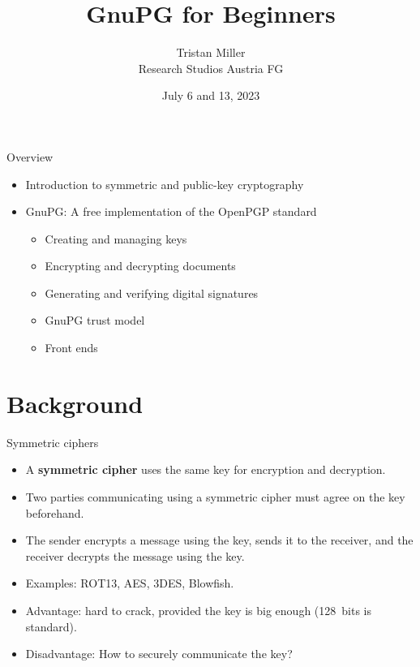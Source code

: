 \documentclass[
mode=present,
paper=smartboard,
size=20pt,
]{powerdot}
\title{GnuPG for Beginners}
\author{%
  Tristan Miller\\
  Research Studios Austria FG
}
\date{July 6 and 13, 2023}
\begin{document}
\maketitle

\begin{slide}[toc=]{Overview}
  \begin{itemize}
  \item Introduction to symmetric and public-key cryptography
  \item GnuPG: A free implementation of the OpenPGP standard
    \begin{itemize}
    \item Creating and managing keys
    \item Encrypting and decrypting documents
    \item Generating and verifying digital signatures
    \item GnuPG trust model
    \item Front ends
    \end{itemize}
  \end{itemize}
\end{slide}

\section{Background}
\begin{slide}{Symmetric ciphers}
  \begin{itemize}
  \item A \textbf{symmetric cipher} uses the same key for encryption
    and decryption.
  \item Two parties communicating using a symmetric cipher must agree
    on the key beforehand.
  \item The sender encrypts a message using the key,
    sends it to the receiver, and the receiver decrypts the message
    using the key.
  \item Examples: ROT13, AES, 3DES, Blowfish.
  \item Advantage: hard to crack, provided the key is big enough
    (128~bits is standard).
  \item Disadvantage: How to securely communicate the key?
  \end{itemize}
\end{slide}
\end{document}
